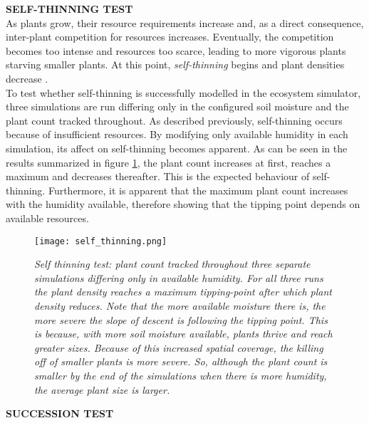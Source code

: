 \textbf{SELF-THINNING TEST}\\

As plants grow, their resource requirements increase and, as a direct consequence, inter-plant competition for resources increases. Eventually, the competition becomes too intense and resources too scarce, leading to more vigorous plants starving smaller plants. At this point, \textit{self-thinning} begins and plant densities decrease \cite{Lane2002}.\\
To test whether self-thinning is successfully modelled in the ecosystem simulator, three simulations are run differing only in the configured soil moisture and the plant count tracked throughout. As described previously, self-thinning occurs because of insufficient resources. By modifying only available humidity in each simulation, its affect on self-thinning becomes apparent. As can be seen in the results summarized in figure \ref{fig:self_thinning_test_results}, the plant count increases at first, reaches a maximum and decreases thereafter. This is the expected behaviour of self-thinning. Furthermore, it is apparent that the maximum plant count increases with the humidity available, therefore showing that the tipping point depends on available resources.\\

\begin{figure}
\center
	\texttt{[image: self\_thinning.png]}
	\caption{ \textit{Self thinning test: plant count tracked throughout three separate simulations differing only in available humidity. For all three runs the plant density reaches a maximum tipping-point after which plant density reduces. Note that the more available moisture there is, the more severe the slope of descent is following the tipping point. This is because, with more soil moisture available, plants thrive and reach greater sizes. Because of this increased spatial coverage, the killing off of smaller plants is more severe. So, although the plant count is smaller by the end of the simulations when there is more humidity, the average plant size is larger.}}
	\label{fig:self_thinning_test_results}
\end{figure}

\textbf{SUCCESSION TEST}\\

